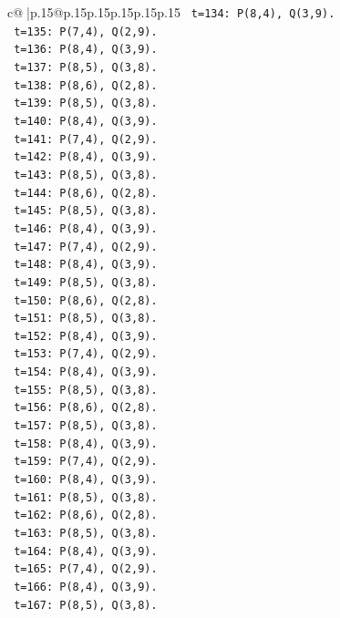 \documentclass{article}
\begin{document}
{\begin{supertabular}{c@{$\;$}|p{.15\linewidth}@{}p{.15\linewidth}p{.15\linewidth}p{.15\linewidth}p{.15\linewidth}p{.15\linewidth}}
{{{\texttt{   t=134: P(8,4), Q(3,9).} \\
\texttt{   t=135: P(7,4), Q(2,9).} \\
\texttt{   t=136: P(8,4), Q(3,9).} \\
\texttt{   t=137: P(8,5), Q(3,8).} \\
\texttt{   t=138: P(8,6), Q(2,8).} \\
\texttt{   t=139: P(8,5), Q(3,8).} \\
\texttt{   t=140: P(8,4), Q(3,9).} \\
\texttt{   t=141: P(7,4), Q(2,9).} \\
\texttt{   t=142: P(8,4), Q(3,9).} \\
\texttt{   t=143: P(8,5), Q(3,8).} \\
\texttt{   t=144: P(8,6), Q(2,8).} \\
\texttt{   t=145: P(8,5), Q(3,8).} \\
\texttt{   t=146: P(8,4), Q(3,9).} \\
\texttt{   t=147: P(7,4), Q(2,9).} \\
\texttt{   t=148: P(8,4), Q(3,9).} \\
\texttt{   t=149: P(8,5), Q(3,8).} \\
\texttt{   t=150: P(8,6), Q(2,8).} \\
\texttt{   t=151: P(8,5), Q(3,8).} \\
\texttt{   t=152: P(8,4), Q(3,9).} \\
\texttt{   t=153: P(7,4), Q(2,9).} \\
\texttt{   t=154: P(8,4), Q(3,9).} \\
\texttt{   t=155: P(8,5), Q(3,8).} \\
\texttt{   t=156: P(8,6), Q(2,8).} \\
\texttt{   t=157: P(8,5), Q(3,8).} \\
\texttt{   t=158: P(8,4), Q(3,9).} \\
\texttt{   t=159: P(7,4), Q(2,9).} \\
\texttt{   t=160: P(8,4), Q(3,9).} \\
\texttt{   t=161: P(8,5), Q(3,8).} \\
\texttt{   t=162: P(8,6), Q(2,8).} \\
\texttt{   t=163: P(8,5), Q(3,8).} \\
\texttt{   t=164: P(8,4), Q(3,9).} \\
\texttt{   t=165: P(7,4), Q(2,9).} \\
\texttt{   t=166: P(8,4), Q(3,9).} \\
\texttt{   t=167: P(8,5), Q(3,8).} \\
}}}
\end{supertabular}}
\end{document}
